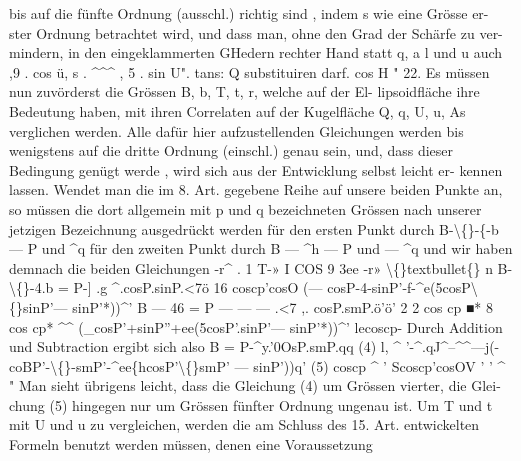 \documentclass[12pt,a4paper]{article}
\begin{document}
bis  auf  die  fünfte  Ordnung  (ausschl.)  richtig  sind ,  indem  s  wie  eine  Grösse  er- ster Ordnung  betrachtet  wird,  und  dass  man,  ohne  den  Grad  der  Schärfe  zu  ver- mindern, in  den  eingeklammerten  GHedern  rechter  Hand  statt  q,  a  l  und  u  auch ,9 .  cos ü,    s .  \^{}\^{}\^{} ,    5 .  sin  U".  tans:  Q    substituiren  darf. cos  H  " 22. Es  müssen  nun  zuvörderst  die  Grössen  B,  b,  T,  t,  r,  welche  auf  der  El- lipsoidfläche  ihre  Bedeutung  haben,  mit  ihren  Correlaten  auf  der  Kugelfläche Q,  q,  U,  u,  As  verglichen  werden.  Alle  dafür  hier  aufzustellenden  Gleichungen werden  bis  wenigstens  auf  die  dritte  Ordnung  (einschl.)  genau  sein,  und,  dass dieser  Bedingung  genügt  werde ,  wird  sich  aus  der  Entwicklung  selbst  leicht  er- kennen lassen. Wendet  man  die  im  8.  Art.  gegebene  Reihe  auf  unsere  beiden  Punkte  an, so  müssen  die  dort  allgemein  mit  p  und  q  bezeichneten  Grössen  nach  unserer jetzigen  Bezeichnung  ausgedrückt  werden für  den  ersten  Punkt  durch       B-\textbackslash\{\}-\{-b --- P  und  \^{}q für  den  zweiten  Punkt  durch    B --- \^{}h  ---  P  und  --- \^{}q und  wir  haben  demnach  die  beiden  Gleichungen -r\^{}    .         1  T-»    I      COS 9  3ee  -r»      \textbackslash\{\}textbullet\{\}      n B-\textbackslash\{\}-4.b  =  P-]   .g   \^{}.cosP.sinP.<7ö 16  coscp'cosO (--- cosP-4-sinP'-f-\^{}e(5cosP\textbackslash\{\}sinP'--- sinP'*))\^{}' B --- 46  =  P --- --- ---  .<7   ,.  cosP.smP.ö'ö' 2  2  cos  cp     ■*  8  cos  cp*  \^{}\^{} (\_cosP'+sinP''+ee(5cosP'.sinP'--- sinP'*))\^{}' lecoscp- Durch  Addition  und  Subtraction  ergibt  sich  also B  =  P-\^{}y.'0OsP.smP.qq (4) l,  \^{}  '-\^{}.qJ\^{}--\^{}\^{}---j(-coBP'-\textbackslash\{\}-smP'-\^{}ee\{hcosP'\textbackslash\{\}smP'  ---  sinP'))q'      (5) coscp    \^{}     '     Scoscp'cosOV  '  '  \^{}  " Man  sieht  übrigens  leicht,  dass  die  Gleichung  (4)  um  Grössen  vierter,  die  Glei- chung (5)  hingegen  nur  um  Grössen  fünfter  Ordnung  ungenau  ist. Um    T  und   t  mit    U  und   u  zu  vergleichen,  werden  die  am  Schluss  des 15.  Art.  entwickelten  Formeln  benutzt  werden  müssen,  denen  eine  Voraussetzung
\end{document}
